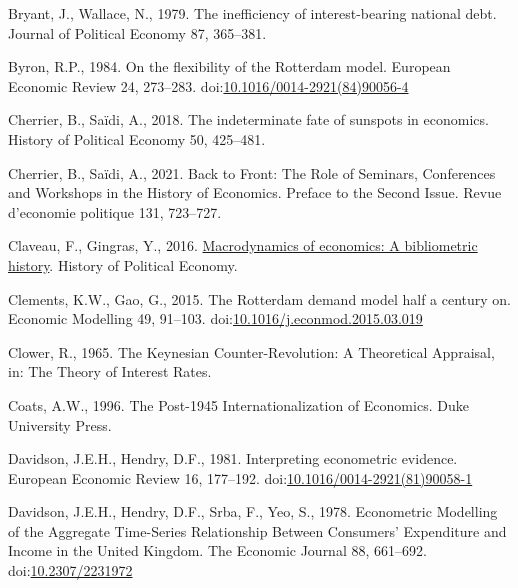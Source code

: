\documentclass[
  12pt,
  onecolumn]{article}
\newlength{\cslhangindent}
\newlength{\cslentryspacingunit} %
\newenvironment{CSLReferences}[2] %
 {%
  \setlength{\parindent}{0pt}
  \ifodd #1
  \let\oldpar\par
  \def\par{\hangindent=\cslhangindent\oldpar}
  \fi
  \setlength{\parskip}{#2\cslentryspacingunit}
 }%
 {}
\begin{document}
\begin{CSLReferences}{1}{0}
\leavevmode{}%
Bryant, J., Wallace, N., 1979. The inefficiency of interest-bearing
national debt. Journal of Political Economy 87, 365--381.

\leavevmode{}%
Byron, R.P., 1984. On the flexibility of the {Rotterdam} model. European
Economic Review 24, 273--283.
doi:\href{https://doi.org/10.1016/0014-2921(84)90056-4}{10.1016/0014-2921(84)90056-4}

\leavevmode{}%
Cherrier, B., Saïdi, A., 2018. The indeterminate fate of sunspots in
economics. History of Political Economy 50, 425--481.

\leavevmode{}%
Cherrier, B., Saïdi, A., 2021. Back to {Front}: {The Role} of
{Seminars}, {Conferences} and {Workshops} in the {History} of
{Economics}. {Preface} to the {Second Issue}. Revue d'economie politique
131, 723--727.

\leavevmode{}%
Claveau, F., Gingras, Y., 2016.
\href{http://hope.dukejournals.org/cgi/content/short/48/4/551?rss=1}{Macrodynamics
of economics: A bibliometric history}. History of Political Economy.

\leavevmode{}%
Clements, K.W., Gao, G., 2015. The {Rotterdam} demand model half a
century on. Economic Modelling 49, 91--103.
doi:\href{https://doi.org/10.1016/j.econmod.2015.03.019}{10.1016/j.econmod.2015.03.019}

\leavevmode{}%
Clower, R., 1965. The {Keynesian Counter-Revolution}: {A Theoretical
Appraisal}, in: The {Theory} of {Interest Rates}.

\leavevmode{}%
Coats, A.W., 1996. The Post-1945 Internationalization of Economics. Duke
University Press.

\leavevmode{}%
Davidson, J.E.H., Hendry, D.F., 1981. Interpreting econometric evidence.
European Economic Review 16, 177--192.
doi:\href{https://doi.org/10.1016/0014-2921(81)90058-1}{10.1016/0014-2921(81)90058-1}

\leavevmode{}%
Davidson, J.E.H., Hendry, D.F., Srba, F., Yeo, S., 1978. Econometric
{Modelling} of the {Aggregate Time-Series Relationship Between
Consumers}' {Expenditure} and {Income} in the {United Kingdom}. The
Economic Journal 88, 661--692.
doi:\href{https://doi.org/10.2307/2231972}{10.2307/2231972}


\end{CSLReferences}
\end{document}
